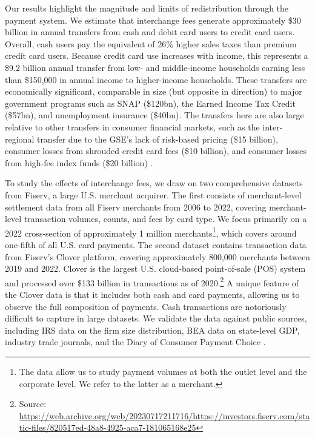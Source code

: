 \documentclass[11pt,english]{article}
\theoremstyle{remark}
\begin{document}
Our results highlight the magnitude and limits of redistribution through the payment system.
We estimate that interchange fees generate approximately \$30 billion in annual transfers from cash and debit card users to credit card users.
Overall, cash users pay the equivalent of 26\% higher sales taxes than premium credit card users.
Because credit card use increases with income, this represents a \$9.2 billion annual transfer from low- and middle-income households earning less than \$150,000 in annual income to higher-income households.
These transfers are economically significant, comparable in size (but opposite in direction) to major government programs such as SNAP (\$120bn), the Earned Income Tax Credit (\$57bn), and unemployment insurance (\$40bn).
The transfers here are also large relative to other transfers in consumer financial markets, such as the inter-regional transfer due to the GSE's lack of risk-based pricing (\$15 billion), consumer losses from shrouded credit card fees (\$10 billion), and consumer losses from high-fee index funds (\$20 billion) \citep{Hurst.etal2016, agarwal2015regulating, Brown.etal2024}.

To study the effects of interchange fees, we draw on two comprehensive datasets from Fiserv, a large U.S. merchant acquirer.
The first consists of merchant-level settlement data from all Fiserv merchants from 2006 to 2022, covering merchant-level transaction volumes, counts, and fees by card type.
We focus primarily on a 2022 cross-section of approximately 1 million merchants\footnote{The data allow us to study payment volumes at both the outlet level and the corporate level.
We refer to the latter as a merchant.}, which covers around one-fifth of all U.S. card payments.
The second dataset contains transaction data from Fiserv's Clover platform, covering approximately 800,000 merchants between 2019 and 2022.
Clover is the largest U.S. cloud-based point-of-sale (POS) system and processed over \$133 billion in transactions as of 2020.\footnote{Source: \url{https://web.archive.org/web/20230717211716/https://investors.fiserv.com/static-files/820517ed-48a8-4925-aca7-181065168e25}} A unique feature of the Clover data is that it includes both cash and card payments, allowing us to observe the full composition of payments.
Cash transactions are notoriously difficult to capture in large datasets.
We validate the data against public sources, including IRS data on the firm size distribution, BEA data on state-level GDP, industry trade journals, and the Diary of Consumer Payment Choice \citep{Foster.etal2024}.
\end{document}
